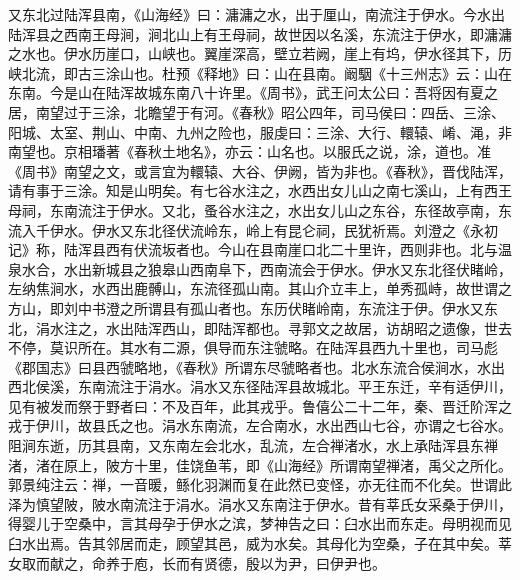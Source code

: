 \documentclass[12pt,UTF8]{ctexbook}
\begin{document}
又东北过陆浑县南，《山海经》曰：滽滽之水，出于厘山，南流注于伊水。今水出陆浑县之西南王母涧，涧北山上有王母祠，故世因以名溪，东流注于伊水，即滽滽之水也。伊水历崖口，山峡也。翼崖深高，壁立若阙，崖上有坞，伊水径其下，历峡北流，即古三涂山也。杜预《释地》曰：山在县南。阚駰《十三州志》云：山在东南。今是山在陆浑故城东南八十许里。《周书》，武王问太公曰：吾将因有夏之居，南望过于三涂，北瞻望于有河。《春秋》昭公四年，司马侯曰：四岳、三涂、阳城、太室、荆山、中南、九州之险也，服虔曰：三涂、大行、轘辕、崤、渑，非南望也。京相璠著《春秋土地名》，亦云：山名也。以服氏之说，涂，道也。准《周书》南望之文，或言宜为轘辕、大谷、伊阙，皆为非也。《春秋》，晋伐陆浑，请有事于三涂。知是山明矣。有七谷水注之，水西出女儿山之南七溪山，上有西王母祠，东南流注于伊水。又北，蚤谷水注之，水出女儿山之东谷，东径故亭南，东流入千伊水。伊水又东北径伏流岭东，岭上有昆仑祠，民犹祈焉。刘澄之《永初记》称，陆浑县西有伏流坂者也。今山在县南崖口北二十里许，西则非也。北与温泉水合，水出新城县之狼皋山西南阜下，西南流会于伊水。伊水又东北径伏睹岭，左纳焦涧水，水西出鹿髆山，东流径孤山南。其山介立丰上，单秀孤峙，故世谓之方山，即刘中书澄之所谓县有孤山者也。东历伏睹岭南，东流注于伊。伊水又东北，涓水注之，水出陆浑西山，即陆浑都也。寻郭文之故居，访胡昭之遗像，世去不停，莫识所在。其水有二源，俱导而东注虢略。在陆浑县西九十里也，司马彪《郡国志》曰县西虢略地，《春秋》所谓东尽虢略者也。北水东流合侯涧水，水出西北侯溪，东南流注于涓水。涓水又东径陆浑县故城北。平王东迁，辛有适伊川，见有被发而祭于野者曰：不及百年，此其戎乎。鲁僖公二十二年，秦、晋迁阶浑之戎于伊川，故县氏之也。涓水东南流，左合南水，水出西山七谷，亦谓之七谷水。阻涧东逝，历其县南，又东南左会北水，乱流，左合禅渚水，水上承陆浑县东禅渚，渚在原上，陂方十里，佳饶鱼苇，即《山海经》所谓南望禅渚，禹父之所化。郭景纯注云：禅，一音暖，鲧化羽渊而复在此然已变怪，亦无往而不化矣。世谓此泽为慎望陂，陂水南流注于涓水。涓水又东南注于伊水。昔有莘氏女采桑于伊川，得婴儿于空桑中，言其母孕于伊水之滨，梦神告之曰：臼水出而东走。母明视而见臼水出焉。告其邻居而走，顾望其邑，威为水矣。其母化为空桑，子在其中矣。莘女取而献之，命养于庖，长而有贤德，殷以为尹，曰伊尹也。
\end{document}
